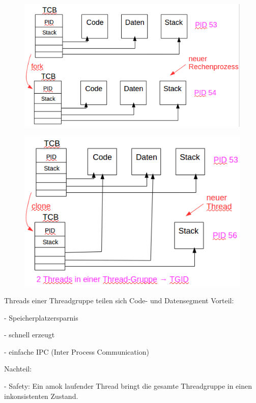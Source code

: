 \documentclass[12pt,a4paper,oneside,ngerman]{article}
\begin{document}
\begin{figure}[H]
	\centering
	\includegraphics[scale=0.8]{umlet/fork.png}
\end{figure}

\begin{figure}[H]
	\centering
	\includegraphics[scale=0.8]{umlet/clone.png}
\end{figure}

Threads einer Threadgruppe teilen sich Code- und Datensegment
Vorteil:
\begin{description}
	\item - Speicherplatzersparnis
	\item - schnell erzeugt
	\item - einfache IPC (Inter Process Communication)
\end{description}
Nachteil:
\begin{description}
	\item - Safety: Ein amok laufender Thread bringt die gesamte Threadgruppe in einen inkonsistenten Zustand.
\end{description}
\end{document}
